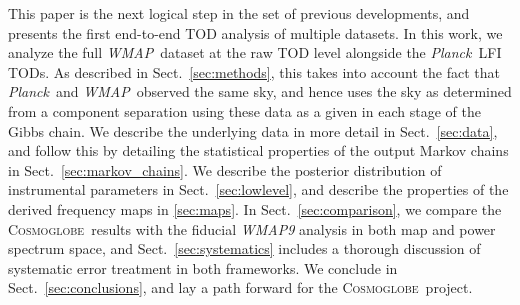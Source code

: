 \documentclass[twocolumn]{../../common/aa}
\def\WMAP{\emph{WMAP}}
\def\Planck{\emph{Planck}}
\newcommand{\cosmoglobe}{\textsc{Cosmoglobe}}
\begin{document}
This paper is the next logical step in the set of previous developments, and presents the first end-to-end TOD analysis of multiple datasets. In this work, we analyze the full \WMAP\ dataset at the raw TOD level alongside the \Planck\ LFI TODs. As described in Sect.~\ref{sec:methods}, this takes into account the fact that \Planck\ and \WMAP\ observed the same sky, and hence uses the sky as determined from a component separation using these data as a given in each stage of the Gibbs chain. We describe the underlying data in more detail in Sect.~\ref{sec:data}, and follow this by detailing the statistical properties of the output Markov chains in Sect.~\ref{sec:markov_chains}. We describe the posterior distribution of instrumental parameters in Sect.~\ref{sec:lowlevel},  and describe the properties of the derived frequency maps in \ref{sec:maps}. In Sect.~\ref{sec:comparison}, we compare the \cosmoglobe\ results with the fiducial \textit{WMAP9} analysis in both map and power spectrum space, and Sect.~\ref{sec:systematics} includes a thorough discussion of systematic error treatment in both frameworks. We conclude in Sect.~\ref{sec:conclusions}, and lay a path forward for the \cosmoglobe\ project.


% 
% 
\end{document}
